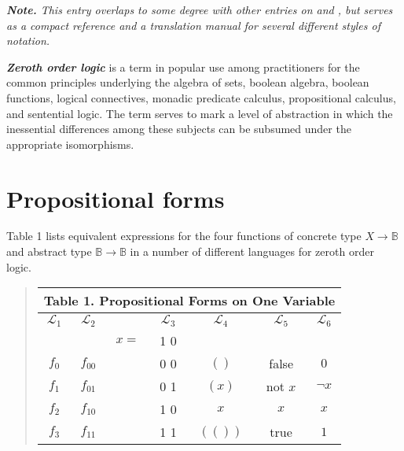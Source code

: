 \documentclass[12pt]{article}
\begin{document}

\textit{\textbf{Note.}  This entry overlaps to some degree with other entries on  and , but serves as a compact reference and a translation manual for several different styles of notation.}

\textit{\textbf{Zeroth order logic}} is a term in popular use among practitioners for the common principles underlying the algebra of sets, boolean algebra, boolean functions, logical connectives, monadic predicate calculus, propositional calculus, and sentential logic.  The term serves to mark a level of abstraction in which the inessential differences among these subjects can be subsumed under the appropriate isomorphisms.

\tableofcontents

\section{Propositional forms}

Table 1 lists equivalent expressions for the four functions of concrete type $X \to \mathbb{B}$ and abstract type $\mathbb{B} \to \mathbb{B}$ in a number of different languages for zeroth order logic.

\begin{quote}\begin{tabular}{|c|c|c|c|c|c|c|}
\multicolumn{7}{c}{\textbf{Table 1.  Propositional Forms on One Variable}} \\
\hline
$\mathcal{L}_1$ & $\mathcal{L}_2$ &&
$\mathcal{L}_3$ & $\mathcal{L}_4$ &
$\mathcal{L}_5$ & $\mathcal{L}_6$ \\
\hline
& & $x =$ & 1 0 & & & \\
\hline
$f_{0}$ & $f_{00}$ & & 0 0 &  $( )$  & false   & $0$       \\
$f_{1}$ & $f_{01}$ & & 0 1 &  $(x)$  & not $x$ & $\lnot x$ \\
$f_{2}$ & $f_{10}$ & & 1 0 &   $x$   & $x$     & $x$       \\
$f_{3}$ & $f_{11}$ & & 1 1 & $(( ))$ & true    & $1$       \\
\hline
\end{tabular}\end{quote}
\end{document}
